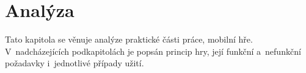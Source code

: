 \chapter{Analýza}
\label{chap:analysis}

Tato kapitola se věnuje analýze praktické části práce,
mobilní hře.
V~nadcházejících podkapitolách je popsán princip hry,
její funkční a~nefunkční požadavky
i~jednotlivé případy užití.





